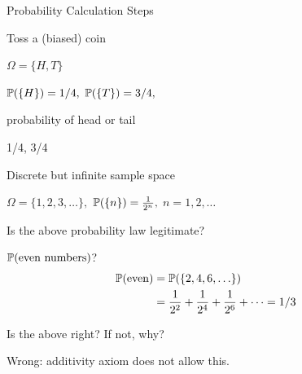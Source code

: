 \begin{frame}{Probability Calculation Steps}


{
Toss a (biased) coin

\plitemsep 0.1in

\bce
\item $\Omega = \{H,T \}$ 

\item $\mathbb{P}( \{H \} ) = 1/4,$ $\mathbb{P}( \{T \} ) = 3/4,$

\item probability of head or tail

\item 1/4, 3/4
\ece
}
\end{frame}

\begin{frame}{Discrete but infinite sample space}


\plitemsep 0.07in

\bci
\item $\Omega = \{1,2, 3, \ldots \},$  $\mathbb{P}( \{ n \} ) = \frac{1}{2^n},$ $n=1,2, \ldots$ 

\item<2-> Is the above probability law legitimate? 
{
}
\vspace{-0.3cm}
\item<4-> $\mathbb{P}( \text{even numbers} )$?
{
\begin{align*}
 \mathbb{P}( \text{even} ) 
 &= \mathbb{P}( \{2,4, 6, \ldots \} ) \cr    
 &= \frac{1}{2^2} + \frac{1}{2^4} + \frac{1}{2^6} + \cdots = 1/3
\end{align*}}

\item<6-> Is the above right? If not, why?
\bci
\item<7-> Wrong:  additivity axiom does not allow this.
\eci

\eci

\end{frame}

